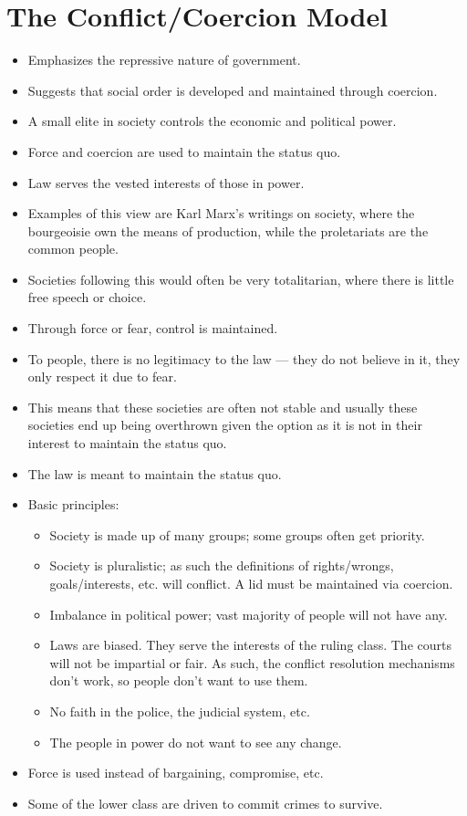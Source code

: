 \documentclass{article}
\begin{document}
\section{The Conflict/Coercion Model}
\begin{itemize}
    \item Emphasizes the repressive nature of government.
    \item Suggests that social order is developed and maintained through coercion.
    \item A small elite in society controls the economic and political power.
    \item Force and coercion are used to maintain the status quo.
    \item Law serves the vested interests of those in power.
    \item Examples of this view are Karl Marx's writings on society, where the bourgeoisie own the means of production, while the proletariats are the common people.
    \item Societies following this would often be very totalitarian, where there is little free speech or choice.
    \item Through force or fear, control is maintained.
    \item To people, there is no legitimacy to the law --- they do not believe in it, they only respect it due to fear.
    \item This means that these societies are often not stable and usually these societies end up being overthrown given the option as it is not in their interest to maintain the status quo.
    \item The law is meant to maintain the status quo.
    \item Basic principles:
        \begin{itemize}
            \item Society is made up of many groups; some groups often get priority.
            \item Society is pluralistic; as such the definitions of rights/wrongs, goals/interests, etc. will conflict.  A lid must be maintained via coercion.
            \item Imbalance in political power; vast majority of people will not have any.
            \item Laws are biased.  They serve the interests of the ruling class.  The courts will not be impartial or fair.  As such, the conflict resolution mechanisms don't work, so people don't want to use them.
            \item No faith in the police, the judicial system, etc.
            \item The people in power do not want to see any change.
        \end{itemize}
    \item Force is used instead of bargaining, compromise, etc.
    \item Some of the lower class are driven to commit crimes to survive.
\end{itemize}
\end{document}
